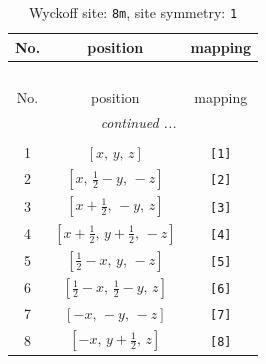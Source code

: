 \documentclass[fleqn,8pt]{jsarticle}
\begin{document}
\renewcommand{\arraystretch}{1.2}
\begin{longtable}{ccc}
\caption{Wyckoff site: {\tt 8m}, site symmetry: {\tt 1}}
 \\
 \hline \hline
No. & position & mapping \\ \hline \endfirsthead

\multicolumn{2}{l}{\tablename\ \thetable{}} \\
 \hline \hline
No. & position & mapping \\ \hline \endhead

 \hline \hline
\multicolumn{2}{r}{\footnotesize\it continued ...} \\ \endfoot

 \hline \hline
\multicolumn{2}{r}{} \\ \endlastfoot

1 & $\left[ x,\, y,\, z \right]$ & {\tt [1]} \\ \hline
2 & $\left[ x,\, \frac{1}{2} - y,\, - z \right]$ & {\tt [2]} \\ \hline
3 & $\left[ x + \frac{1}{2},\, - y,\, z \right]$ & {\tt [3]} \\ \hline
4 & $\left[ x + \frac{1}{2},\, y + \frac{1}{2},\, - z \right]$ & {\tt [4]} \\ \hline
5 & $\left[ \frac{1}{2} - x,\, y,\, - z \right]$ & {\tt [5]} \\ \hline
6 & $\left[ \frac{1}{2} - x,\, \frac{1}{2} - y,\, z \right]$ & {\tt [6]} \\ \hline
7 & $\left[ - x,\, - y,\, - z \right]$ & {\tt [7]} \\ \hline
8 & $\left[ - x,\, y + \frac{1}{2},\, z \right]$ & {\tt [8]} \\
\end{longtable}
\end{document}
